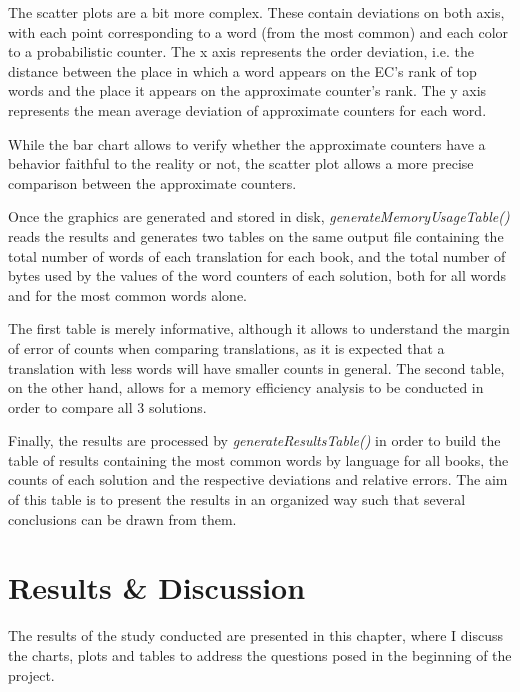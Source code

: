 \documentclass[shortpaper]{revdetua}
\begin{document}
The scatter plots are a bit more complex.
These contain deviations on both axis, with each point corresponding to 
a word (from the most common) and each color to a probabilistic counter.
The x axis represents the order deviation, i.e. the distance between the place 
in which a word appears on the EC's rank of top words and the place it appears 
on the approximate counter's rank.
The y axis represents the mean average deviation of approximate counters for 
each word.

While the bar chart allows to verify whether the approximate counters have a 
behavior faithful to the reality or not, the scatter plot allows a more precise 
comparison between the approximate counters.
\newline

Once the graphics are generated and stored in disk, \textit{generateMemoryUsageTable()} 
reads the results and generates two tables on the same output file containing 
the total number of words of each translation for each book, and the total number 
of bytes used by the values of the word counters of each solution, both for all 
words and for the most common words alone.

The first table is merely informative, although it allows to understand the 
margin of error of counts when comparing translations, as it is expected that a 
translation with less words will have smaller counts in general.
The second table, on the other hand, allows for a memory efficiency analysis to
be conducted in order to compare all 3 solutions.
\newline

Finally, the results are processed by \textit{generateResultsTable()} in order 
to build the table of results containing the most common words by language for 
all books, the counts of each solution and the respective deviations and relative
errors.
The aim of this table is to present the results in an organized way such that 
several conclusions can be drawn from them.


\section{Results \& Discussion}

The results of the study conducted are presented in this chapter, where I 
discuss the charts, plots and tables to address the questions posed in the 
beginning of the project.
\end{document}
